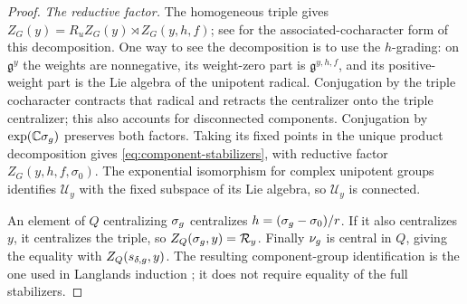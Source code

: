 \documentclass[10pt,a4paper]{amsart}
\begin{document}
\begin{proof}
\emph{The reductive factor.}
The homogeneous triple gives
$Z_G(y)=R_uZ_G(y)\rtimes Z_G(y,h,f)$;
see \cite[(4.1.1)(b)--(d)]{McNinch} for the associated-cocharacter
form of this decomposition.
One way to see the decomposition is to use the $h$-grading: on
$\mathfrak g^y$ the weights are nonnegative, its weight-zero part is
$\mathfrak g^{y,h,f}$, and its positive-weight part is the Lie algebra
of the unipotent radical.  Conjugation by the triple cocharacter
contracts that radical and retracts the centralizer onto the
triple centralizer; this also accounts for disconnected components.
Conjugation by $\exp(\mathbb C\sigma_{\rm g})$ preserves both factors.
Taking its fixed points in the unique product decomposition gives
\eqref{eq:component-stabilizers}, with reductive factor
$Z_G(y,h,f,\sigma_0)$.  The exponential isomorphism for complex
unipotent groups identifies $\mathcal U_y$ with the fixed subspace
of its Lie algebra, so $\mathcal U_y$ is connected.

An element of $Q$ centralizing $\sigma_{\rm g}$ centralizes
$h=(\sigma_{\rm g}-\sigma_0)/r$.  If it also centralizes $y$, it
centralizes the triple, so $Z_Q(\sigma_{\rm g},y)=\mathcal R_y$.
Finally $\nu_{\rm g}$ is central in $Q$, giving the equality with
$Z_Q(s_{\delta,{\rm g}},y)$.  The resulting component-group
identification is the one used in Langlands induction
\cite[Theorem~B.2(c) and Proposition~B.4]{Solleveld}; it does not
require equality of the full stabilizers.


\end{proof}
\end{document}
